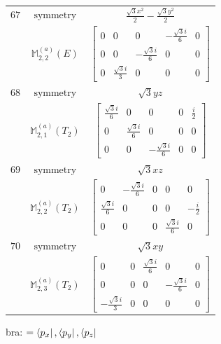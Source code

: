 \documentclass[fleqn,8pt,landscape]{jsarticle}
\begin{document}
\begin{longtable}{ccc}
$ 67 $ & $ \text{symmetry} $ & $ \frac{\sqrt{3} x^{2}}{2} - \frac{\sqrt{3} y^{2}}{2} $ \\
$  $ & $ \mathbb{M}_{2,2}^{(a)}(E) $ & $ \begin{bmatrix} 0 & 0 & 0 & - \frac{\sqrt{3} i}{6} & 0 \\ 0 & 0 & - \frac{\sqrt{3} i}{6} & 0 & 0 \\ 0 & \frac{\sqrt{3} i}{3} & 0 & 0 & 0 \end{bmatrix} $ \\ \hline
$ 68 $ & $ \text{symmetry} $ & $ \sqrt{3} y z $ \\
$  $ & $ \mathbb{M}_{2,1}^{(a)}(T_{2}) $ & $ \begin{bmatrix} \frac{\sqrt{3} i}{6} & 0 & 0 & 0 & \frac{i}{2} \\ 0 & \frac{\sqrt{3} i}{6} & 0 & 0 & 0 \\ 0 & 0 & - \frac{\sqrt{3} i}{6} & 0 & 0 \end{bmatrix} $ \\ \hline
$ 69 $ & $ \text{symmetry} $ & $ \sqrt{3} x z $ \\
$  $ & $ \mathbb{M}_{2,2}^{(a)}(T_{2}) $ & $ \begin{bmatrix} 0 & - \frac{\sqrt{3} i}{6} & 0 & 0 & 0 \\ \frac{\sqrt{3} i}{6} & 0 & 0 & 0 & - \frac{i}{2} \\ 0 & 0 & 0 & \frac{\sqrt{3} i}{6} & 0 \end{bmatrix} $ \\ \hline
$ 70 $ & $ \text{symmetry} $ & $ \sqrt{3} x y $ \\
$  $ & $ \mathbb{M}_{2,3}^{(a)}(T_{2}) $ & $ \begin{bmatrix} 0 & 0 & \frac{\sqrt{3} i}{6} & 0 & 0 \\ 0 & 0 & 0 & - \frac{\sqrt{3} i}{6} & 0 \\ - \frac{\sqrt{3} i}{3} & 0 & 0 & 0 & 0 \end{bmatrix} $ \\ \hline
\end{longtable}
bra: $=\bra{p_{x}}, \bra{p_{y}}, \bra{p_{z}}$
\end{document}
